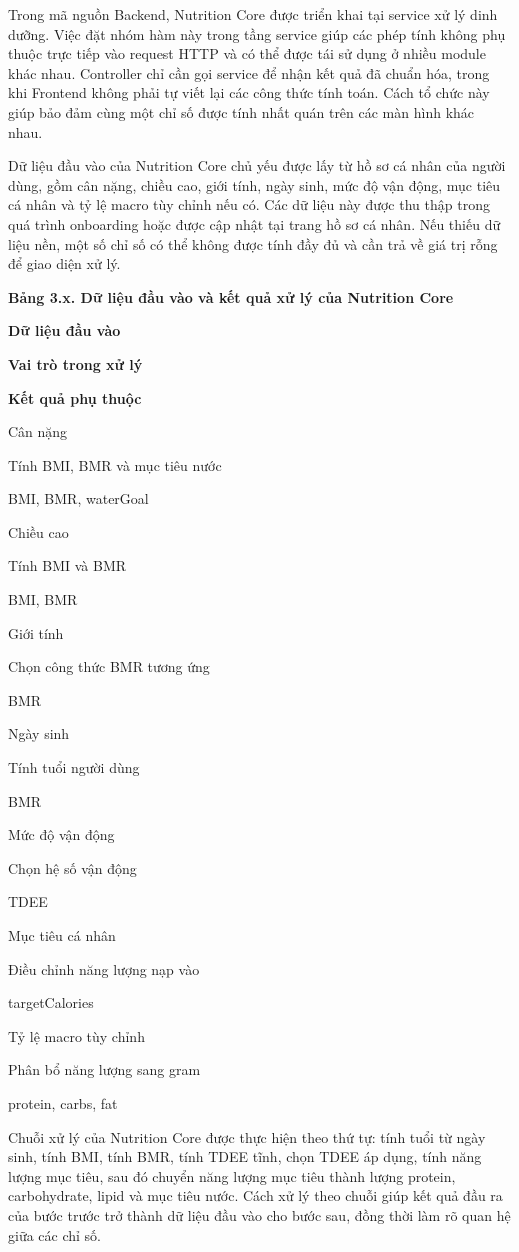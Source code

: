Trong mã nguồn Backend, Nutrition Core được triển khai tại service xử lý dinh dưỡng. Việc đặt nhóm hàm này trong tầng service giúp các phép tính không phụ thuộc trực tiếp vào request HTTP và có thể được tái sử dụng ở nhiều module khác nhau. Controller chỉ cần gọi service để nhận kết quả đã chuẩn hóa, trong khi Frontend không phải tự viết lại các công thức tính toán. Cách tổ chức này giúp bảo đảm cùng một chỉ số được tính nhất quán trên các màn hình khác nhau.

Dữ liệu đầu vào của Nutrition Core chủ yếu được lấy từ hồ sơ cá nhân của người dùng, gồm cân nặng, chiều cao, giới tính, ngày sinh, mức độ vận động, mục tiêu cá nhân và tỷ lệ macro tùy chỉnh nếu có. Các dữ liệu này được thu thập trong quá trình onboarding hoặc được cập nhật tại trang hồ sơ cá nhân. Nếu thiếu dữ liệu nền, một số chỉ số có thể không được tính đầy đủ và cần trả về giá trị rỗng để giao diện xử lý.

\textbf{Bảng 3.x. Dữ liệu đầu vào và kết quả xử lý của Nutrition Core}

\textbf{Dữ liệu đầu vào}

\textbf{Vai trò trong xử lý}

\textbf{Kết quả phụ thuộc}

Cân nặng

Tính BMI, BMR và mục tiêu nước

BMI, BMR, waterGoal

Chiều cao

Tính BMI và BMR

BMI, BMR

Giới tính

Chọn công thức BMR tương ứng

BMR

Ngày sinh

Tính tuổi người dùng

BMR

Mức độ vận động

Chọn hệ số vận động

TDEE

Mục tiêu cá nhân

Điều chỉnh năng lượng nạp vào

targetCalories

Tỷ lệ macro tùy chỉnh

Phân bổ năng lượng sang gram

protein, carbs, fat

Chuỗi xử lý của Nutrition Core được thực hiện theo thứ tự: tính tuổi từ ngày sinh, tính BMI, tính BMR, tính TDEE tĩnh, chọn TDEE áp dụng, tính năng lượng mục tiêu, sau đó chuyển năng lượng mục tiêu thành lượng protein, carbohydrate, lipid và mục tiêu nước. Cách xử lý theo chuỗi giúp kết quả đầu ra của bước trước trở thành dữ liệu đầu vào cho bước sau, đồng thời làm rõ quan hệ giữa các chỉ số.

